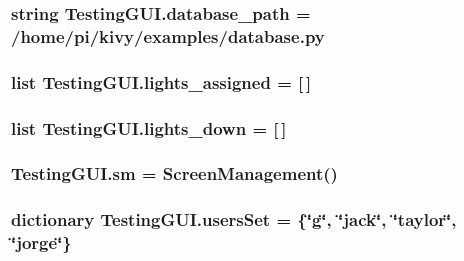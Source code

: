 \subsubsection[{\texorpdfstring{database\+\_\+path}{database_path}}]{\setlength{\rightskip}{0pt plus 5cm}string Testing\+G\+U\+I.\+database\+\_\+path = \textquotesingle{}/home/pi/kivy/examples/database.\+py\textquotesingle{}}\hypertarget{namespaceTestingGUI_a35e81274fb7bccca150736fa44146910}{}\label{namespaceTestingGUI_a35e81274fb7bccca150736fa44146910}
\subsubsection[{\texorpdfstring{lights\+\_\+assigned}{lights_assigned}}]{\setlength{\rightskip}{0pt plus 5cm}list Testing\+G\+U\+I.\+lights\+\_\+assigned = \mbox{[}$\,$\mbox{]}}\hypertarget{namespaceTestingGUI_afbf31e993bfc6222d8d8bea7122e93a5}{}\label{namespaceTestingGUI_afbf31e993bfc6222d8d8bea7122e93a5}
\subsubsection[{\texorpdfstring{lights\+\_\+down}{lights_down}}]{\setlength{\rightskip}{0pt plus 5cm}list Testing\+G\+U\+I.\+lights\+\_\+down = \mbox{[}$\,$\mbox{]}}\hypertarget{namespaceTestingGUI_ac086b5927511e0e2b06690ab3b412797}{}\label{namespaceTestingGUI_ac086b5927511e0e2b06690ab3b412797}
\subsubsection[{\texorpdfstring{sm}{sm}}]{\setlength{\rightskip}{0pt plus 5cm}Testing\+G\+U\+I.\+sm = {\bf Screen\+Management}()}\hypertarget{namespaceTestingGUI_a09440ec859deb60fe3147a2ae81bf30c}{}\label{namespaceTestingGUI_a09440ec859deb60fe3147a2ae81bf30c}
\subsubsection[{\texorpdfstring{users\+Set}{usersSet}}]{\setlength{\rightskip}{0pt plus 5cm}dictionary Testing\+G\+U\+I.\+users\+Set = \{\char`\"{}g\char`\"{}, \char`\"{}jack\char`\"{}, \char`\"{}taylor\char`\"{}, \char`\"{}jorge\char`\"{}\}}\hypertarget{namespaceTestingGUI_a4a1b5baf3d7390a99be46eacbe5c323f}{}\label{namespaceTestingGUI_a4a1b5baf3d7390a99be46eacbe5c323f}
